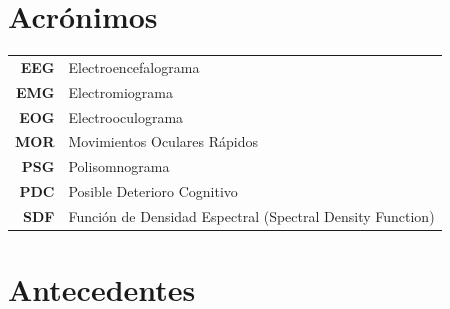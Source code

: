 \documentclass[12pt,a4paper]{mitthesis}
\begin{document}

\chapter*{Acr\'onimos}

\begin{tabular}{rl}
\textbf{EEG} & Electroencefalograma %
\\
\textbf{EMG} & Electromiograma %
\\
\textbf{EOG} & Electrooculograma %
\\
\textbf{MOR} & Movimientos Oculares R\'apidos
\\
\textbf{PSG} & Polisomnograma %
\\
\textbf{PDC} & Posible Deterioro Cognitivo
\\
\textbf{SDF} & Funci\'on de Densidad Espectral (Spectral Density Function)
\end{tabular}

\newpage


\thispagestyle{empty}

\tableofcontents
\newpage


\setcounter{page}{1}

\chapter{Antecedentes}
\end{document}
